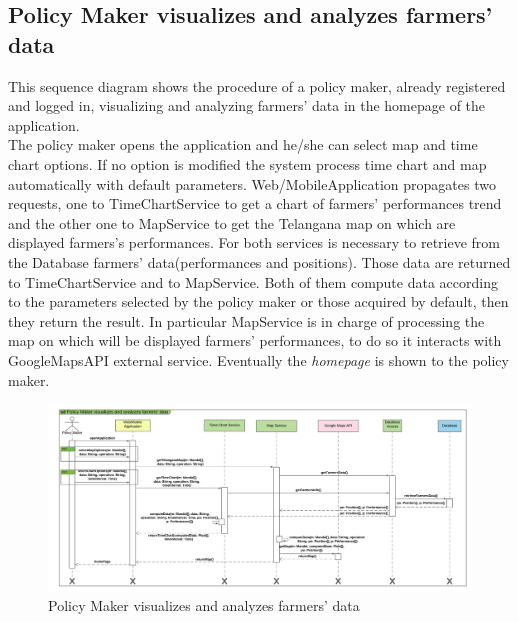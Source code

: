 \subsection{Policy Maker visualizes and analyzes farmers' data}

This sequence diagram shows the procedure of a policy maker, already registered and logged in, visualizing and analyzing farmers' data in the homepage of the application.\\
The policy maker opens the application and he/she can select map and time chart options. If no option is modified the system process time chart and map automatically with default parameters.  
Web/MobileApplication propagates two requests, one to TimeChartService to get a chart of farmers' performances trend and the other one to MapService to get the Telangana map on which are displayed farmers's performances. For both services is necessary to retrieve from the Database farmers' data(performances and positions). Those data are returned to TimeChartService and to MapService. Both of them compute data according to the parameters selected by the policy maker or those acquired by default, then they return the result. In particular MapService is in charge of processing the map on which will be displayed farmers' performances, to do so it interacts with GoogleMapsAPI external service.
Eventually the \textit{homepage} is shown to the policy maker.

\newpage
\begin{landscape}
\begin{figure}[h]
\vspace*{-2cm}
\noindent
\centering
\centerline{\includegraphics[scale= 0.108]{./Images/Sequence diagram/Policy Maker visualizes and analyzes farmers' data.png}}
    \caption{Policy Maker visualizes and analyzes farmers' data}
    \vspace*{-12cm}
\end{figure}
\fillandplacepagenumber
\end{landscape}

















